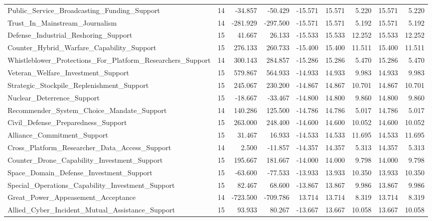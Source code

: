 \begin{table}[htbp]
\begin{threeparttable}
\begin{adjustbox}{max width=\linewidth}
\begin{tabular}{lrrrrrrrr}
Public\_Service\_Broadcasting\_Funding\_Support & 14 & -34.857 & -50.429 & -15.571 & 15.571 & 5.220 & 15.571 & 5.220 \\
Trust\_In\_Mainstream\_Journalism & 14 & -281.929 & -297.500 & -15.571 & 15.571 & 5.192 & 15.571 & 5.192 \\
Defense\_Industrial\_Reshoring\_Support & 15 & 41.667 & 26.133 & -15.533 & 15.533 & 12.252 & 15.533 & 12.252 \\
Counter\_Hybrid\_Warfare\_Capability\_Support & 15 & 276.133 & 260.733 & -15.400 & 15.400 & 11.511 & 15.400 & 11.511 \\
Whistleblower\_Protections\_For\_Platform\_Researchers\_Support & 14 & 300.143 & 284.857 & -15.286 & 15.286 & 5.470 & 15.286 & 5.470 \\
Veteran\_Welfare\_Investment\_Support & 15 & 579.867 & 564.933 & -14.933 & 14.933 & 9.983 & 14.933 & 9.983 \\
Strategic\_Stockpile\_Replenishment\_Support & 15 & 245.067 & 230.200 & -14.867 & 14.867 & 10.701 & 14.867 & 10.701 \\
Nuclear\_Deterrence\_Support & 15 & -18.667 & -33.467 & -14.800 & 14.800 & 9.860 & 14.800 & 9.860 \\
Recommender\_System\_Choice\_Mandate\_Support & 14 & 140.286 & 125.500 & -14.786 & 14.786 & 5.017 & 14.786 & 5.017 \\
Civil\_Defense\_Preparedness\_Support & 15 & 263.000 & 248.400 & -14.600 & 14.600 & 10.052 & 14.600 & 10.052 \\
Alliance\_Commitment\_Support & 15 & 31.467 & 16.933 & -14.533 & 14.533 & 11.695 & 14.533 & 11.695 \\
Cross\_Platform\_Researcher\_Data\_Access\_Support & 14 & 2.500 & -11.857 & -14.357 & 14.357 & 5.313 & 14.357 & 5.313 \\
Counter\_Drone\_Capability\_Investment\_Support & 15 & 195.667 & 181.667 & -14.000 & 14.000 & 9.798 & 14.000 & 9.798 \\
Space\_Domain\_Defense\_Investment\_Support & 15 & -63.600 & -77.533 & -13.933 & 13.933 & 10.350 & 13.933 & 10.350 \\
Special\_Operations\_Capability\_Investment\_Support & 15 & 82.467 & 68.600 & -13.867 & 13.867 & 9.986 & 13.867 & 9.986 \\
Great\_Power\_Appeasement\_Acceptance & 14 & -723.500 & -709.786 & 13.714 & 13.714 & 8.319 & 13.714 & 8.319 \\
Allied\_Cyber\_Incident\_Mutual\_Assistance\_Support & 15 & 93.933 & 80.267 & -13.667 & 13.667 & 10.058 & 13.667 & 10.058 \\

\end{tabular}
\end{adjustbox}
\end{threeparttable}
\end{table}
